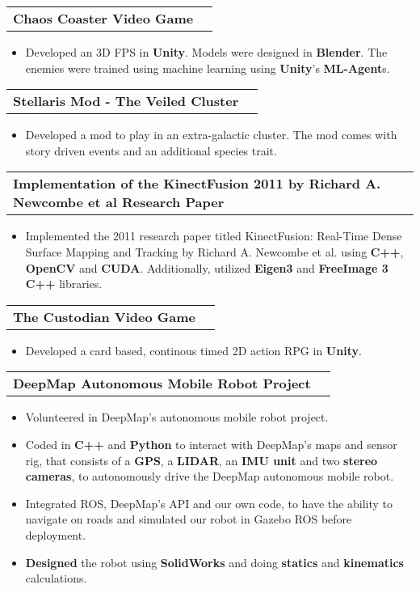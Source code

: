\documentclass[letterpaper,11pt]{article}
\makeatletter
\newcommand{\resumeItem}[1]{
  \item\small{
    {#1 \vspace{-2pt}}
  }
}
\newcommand{\resumeProjectHeading}[2]{
    \item
    \begin{tabular*}{1.001\textwidth}{l@{\extracolsep{\fill}}r}
      \small#1 & \textbf{\small #2}\\
    \end{tabular*}\vspace{-7pt}
}
\newcommand{\resumeItemListStart}{\begin{itemize}}
\newcommand{\resumeItemListEnd}{\end{itemize}\vspace{-5pt}}
\makeatother
\begin{document}
  \vspace{-13pt} 
  \resumeProjectHeading
    {\textbf{\color{blue}Chaos Coaster Video Game}} {}
    \resumeItemListStart
      \resumeItem{Developed an 3D FPS in \textbf{Unity}. Models were designed in \textbf{Blender}. The enemies were trained using machine learning using \textbf{Unity}'s \textbf{ML-Agent}s.}
    \resumeItemListEnd

  \vspace{-13pt}
  \resumeProjectHeading
  {\textbf{\color{blue}Stellaris Mod - The Veiled Cluster}} {}
    \resumeItemListStart
      \resumeItem{Developed a mod to play in an extra-galactic cluster. The mod comes with story driven events and an additional species trait.}
    \resumeItemListEnd

  \vspace{-13pt}
  \resumeProjectHeading
    {\textbf{\color{blue}Implementation of the KinectFusion 2011 by Richard A. Newcombe et al Research Paper}} {}
    \resumeItemListStart
      \resumeItem{Implemented the 2011 research paper titled KinectFusion: Real-Time Dense Surface Mapping and Tracking by Richard A. Newcombe et al. using \textbf{C++}, \textbf{OpenCV} and \textbf{CUDA}. Additionally, utilized \textbf{Eigen3} and \textbf{FreeImage 3} \textbf{C++} libraries.}
    \resumeItemListEnd 

  \vspace{-13pt}
  \resumeProjectHeading
    {\textbf{\color{blue}The Custodian Video Game}} {}
    \resumeItemListStart
      \resumeItem{Developed a card based, continous timed 2D action RPG in \textbf{Unity}.}
    \resumeItemListEnd 

  \vspace{-13pt}
  \resumeProjectHeading
    {\textbf{\color{blue}DeepMap Autonomous Mobile Robot Project}} {}
    \resumeItemListStart
      \resumeItem{Volunteered in DeepMap's autonomous mobile robot project.}
      \resumeItem{Coded in \textbf{C++} and \textbf{Python} to interact with DeepMap’s maps and sensor rig, that consists of a \textbf{GPS}, a \textbf{LIDAR}, an \textbf{IMU unit} and two \textbf{stereo cameras}, to autonomously drive the DeepMap autonomous mobile robot.}
      \resumeItem{Integrated ROS, DeepMap’s API and our own code, to have the ability to navigate on roads and simulated our robot in Gazebo ROS before deployment.}
      \resumeItem{\textbf{Designed} the robot using \textbf{SolidWorks} and doing \textbf{statics} and \textbf{kinematics} calculations.}
    \resumeItemListEnd
    
\end{document}
